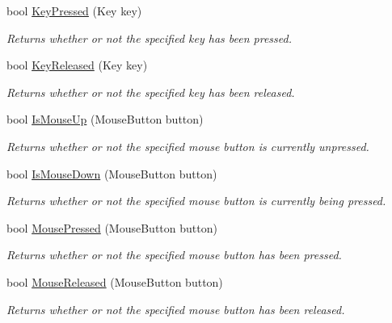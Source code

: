 \begin{DoxyCompactItemize}
bool \hyperlink{class_tri_devs_1_1_tri_engine2_d_1_1_input_1_1_input_manager_ab3a260ea268b4683596ff5a244fd2d95}{Key\-Pressed} (Key key)
\begin{DoxyCompactList}\small\item\em Returns whether or not the specified key has been pressed. \end{DoxyCompactList}\item 
bool \hyperlink{class_tri_devs_1_1_tri_engine2_d_1_1_input_1_1_input_manager_a1e74615e2ccde33e98d262d3c48d729a}{Key\-Released} (Key key)
\begin{DoxyCompactList}\small\item\em Returns whether or not the specified key has been released. \end{DoxyCompactList}\item 
bool \hyperlink{class_tri_devs_1_1_tri_engine2_d_1_1_input_1_1_input_manager_a2d554c09767cc9f36b21f5bcde4cefa3}{Is\-Mouse\-Up} (Mouse\-Button button)
\begin{DoxyCompactList}\small\item\em Returns whether or not the specified mouse button is currently unpressed. \end{DoxyCompactList}\item 
bool \hyperlink{class_tri_devs_1_1_tri_engine2_d_1_1_input_1_1_input_manager_a6a26c5121fad6a3eefcf552a980c6ff3}{Is\-Mouse\-Down} (Mouse\-Button button)
\begin{DoxyCompactList}\small\item\em Returns whether or not the specified mouse button is currently being pressed. \end{DoxyCompactList}\item 
bool \hyperlink{class_tri_devs_1_1_tri_engine2_d_1_1_input_1_1_input_manager_a114492d5a852be9f58b3971511af3c09}{Mouse\-Pressed} (Mouse\-Button button)
\begin{DoxyCompactList}\small\item\em Returns whether or not the specified mouse button has been pressed. \end{DoxyCompactList}\item 
bool \hyperlink{class_tri_devs_1_1_tri_engine2_d_1_1_input_1_1_input_manager_aee465cfdff75ddcf53cd62aa38c09013}{Mouse\-Released} (Mouse\-Button button)
\begin{DoxyCompactList}\small\item\em Returns whether or not the specified mouse button has been released. \end{DoxyCompactList}\item 

\end{DoxyCompactItemize}
